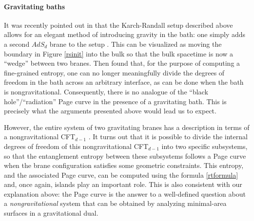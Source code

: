 \documentclass[12pt]{article}
\begin{document}
\paragraph{\bf Gravitating baths \\}
It was recently pointed out in \cite{Geng:2020fxl} that the Karch-Randall setup described above allows for an elegant method of introducing gravity in the bath: one simply adds a second $AdS_{d}$ brane to the setup \cite{Kogan:2000vb}. This can be visualized as moving the boundary in Figure \ref{rsinit} into the bulk so that the bulk spacetime is now a ``wedge'' between two branes.   Then \cite{Geng:2020fxl} found that, for the purpose
of computing a fine-grained entropy, one can no longer meaningfully divide the degrees of freedom in the bath across an arbitrary interface,  as can be done when the bath is nongravitational.   Consequently, there is no analogue of the ``black hole''/``radiation'' Page curve in the presence of a gravitating bath. This is precisely what the arguments presented above would lead us to expect.

However, the entire system of two gravitating branes has a description in terms of a nongravitational CFT$_{d-1}$ \cite{Akal:2020wfl}. It turns out that it is possible to divide the internal degrees of freedom of this nongravitational CFT$_{d-1}$  into two specific subsystems, so that the entanglement entropy between these subsystems follows a Page curve when the brane configuration satisfies some geometric constraints. This entropy, and the associated Page curve, can be computed using the formula \eqref{rtformula} and, once again, islands play an important role. This is also consistent with our explanation above:  the Page curve is the answer to a well-defined 
question about a {\em nongravitational} system that can be obtained by analyzing  minimal-area surfaces in a gravitational dual.
\end{document}
